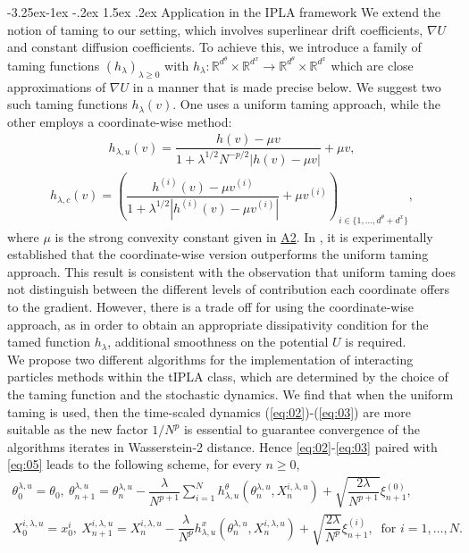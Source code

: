 \documentclass[a4paper, 10pt]{article}
\makeatletter
\theoremstyle{plain}%
\renewcommand\subsubsection{\@startsection{subsubsection}{3}{\z@}%
  {-3.25ex\@plus -1ex \@minus -.2ex}%
  {1.5ex \@plus .2ex}%
  {\normalfont\small\itshape\mdseries}}
\makeatother
\begin{document}
\subsubsection{Application in the IPLA framework}\label{subsec2}
We extend the notion of taming to our setting, which involves superlinear drift coefficients, $\nabla U$ and constant diffusion coefficients. To achieve this,  we introduce a family of taming functions $(h_{\lambda})_{\lambda\geq 0}$ with $h_{\lambda}:\mathbb{R}^{d^\theta}\times\mathbb{R}^{d^x}\to \mathbb{R}^{d^\theta}\times\mathbb{R}^{d^x}$ which are close approximations of $\nabla U$ in a manner that is made precise below. We suggest two such taming functions $h_{\lambda}(v)$. One uses a uniform taming approach, while the other employs a coordinate-wise method:
\begin{align}
    h_{\lambda,u}(v)=\dfrac{h(v)-\mu v}{1+{\lambda}^{1/2}N^{-p/2}|h(v)-\mu v|}+\mu v,\label{eq:05} \end{align}\begin{align}
     h_{\lambda,c}(v)=\left(\dfrac{h^{(i)}(v)-\mu v^{(i)}}{1+{\lambda}^{1/2}|h^{(i)}(v)-\mu v^{(i)}|}+\mu v^{(i)}\right)_{i\in\{1,\ldots,d^{\theta}+d^x\}},\label{eq:06}
\end{align}
where $\mu$ is the strong convexity constant given in \hyperlink{Assum2}{A2}. In \cite{TULA}, it is experimentally established that the coordinate-wise version outperforms the uniform taming approach. This result is consistent with the observation that uniform taming does not distinguish between the different levels of contribution each coordinate offers to the gradient. However, there is a trade off for using the coordinate-wise approach, as in order to obtain an appropriate dissipativity condition for the tamed function $h_{\lambda}$, additional smoothness on the potential $U$ is required.\\
\indent We propose two different algorithms for the implementation of interacting particles methods within the tIPLA class, which are determined by the choice of the taming function and the stochastic dynamics. We find that when the uniform taming is used, then the time-scaled dynamics (\ref{eq:02})-(\ref{eq:03}) are more suitable as the new factor $1/N^p$ is essential to guarantee convergence of the algorithms iterates in Wasserstein-2 distance. Hence \eqref{eq:02}-\eqref{eq:03} paired with \eqref{eq:05} leads to the following scheme, for every $n\geq 0$,
\begin{gather}
\theta^{\lambda,u}_0=\theta_0,\ \theta_{n+1}^{\lambda,u}=\theta_{n}^{\lambda,u}-\dfrac{\lambda}{N^{p+1}}\sum_{i=1}^N h_{\lambda,u}^{\theta}(\theta_{n}^{\lambda,u},X_{n}^{i,\lambda,u})+\sqrt{\dfrac{2\lambda}{N^{p+1}}}\xi^{(0)}_{n+1},\label{eq:07}\\
X^{i,\lambda,u}_0=x^i_0,\ X_{n+1}^{i,\lambda,u}=X_{n}^{i,\lambda,u}-\dfrac{\lambda}{N^p} h_{\lambda,u}^{x}(\theta_{n}^{\lambda,u},X_{n}^{i,\lambda,u})+\sqrt{\dfrac{2\lambda}{N^p}}\xi^{(i)}_{n+1},\ \text{ for } i=1,\ldots,N\label{eq:08}.
\end{gather}
\end{document}
